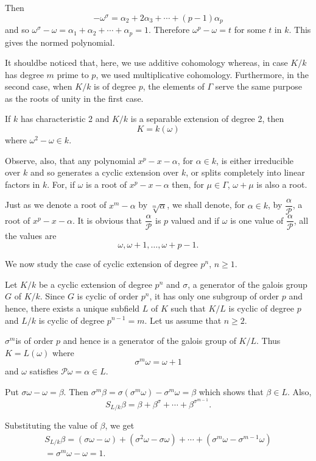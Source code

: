 Then
$$
- \omega^\sigma = \alpha_2 + 2 \alpha_3 + \cdots  + (p-1) \alpha_p 
$$
and so $\omega^\sigma - \omega = \alpha_1 + \alpha_2 + \cdots +
\alpha_p =1$. Therefore $\omega^p - \omega =t$ for some $t$ in
$k$. This gives the normed polynomial. 

It should\pageoriginale be noticed that, here, we use additive
cohomology whereas, in case $K/k$ has degree $m$ prime to $p$, we used
multiplicative cohomology. Furthermore, in the second case, when $K/k$
is of degree $p$, the elements of $\Gamma$ serve the same purpose as
the roots of unity in the first case.  

If $k$ has characteristic 2 and $K/k$ is a separable extension of
degree 2, then 
$$
K = k(\omega)
$$
where $\omega^2-\omega \in k$.

Observe, also, that any polynomial $x^p-x-\alpha$, for $\alpha \in k$,
is either irreducible over $k$ and so generates a cyclic extension
over $k$, or splits completely into linear factors in $k$. For, if
$\omega$ is a root of $x^p - x-\alpha$ then, for $\mu \in \Gamma$,
$\omega + \mu$ is also a root. 

Just as we denote a root of $x^m - \alpha$ by $\sqrt[m]{\alpha}$, we
shall denote, for $\alpha \in k$, by $\dfrac{\alpha}{\mathscr{P}}$, a
root of $x^p-x-\alpha$. It is obvious that
$\dfrac{\alpha}{\mathscr{P}}$ is $p$ valued and if $\omega$ is one
value of $\dfrac{\alpha}{\mathscr{P}}$, all the values are 
$$
\omega, \omega + 1, \ldots,\omega + p-1.
$$

We now study the case of cyclic extension of degree $p^n$, $n \geq 1$.

Let $K/k$ be a cyclic extension of degree $p^n$ and $\sigma$, a
generator of the galois group $G$ of $K/k$. Since $G$ is cyclic of
order $p^n$, it has only one subgroup of order $p$ and hence, there
exists a unique subfield $L$ of $K$ such that $K/L$ is cyclic of
degree $p$ and $L/k$ is cyclic of degree $p^{n-1}=m$. Let us assume
that $n \geq 2$. 

$\sigma^m$\pageoriginale is of order $p$ and hence is a generator of
the galois group of $K/L$. Thus $K=L(\omega)$ where  
$$
\sigma^m \omega = \omega +1
$$
and $\omega$ satisfies $\mathscr{P} \omega = \alpha \in L$.

Put $\sigma \omega -\omega=\beta$. Then $\sigma^m \beta = \sigma
(\sigma^m \omega)- \sigma^m \omega = \beta$ which shows that $\beta
\in L$. Also, 
$$
S_{L/k} \beta = \beta + \beta^\sigma + \cdots + \beta^{\sigma^{m-1}}.
$$

Substituting the value of $\beta$, we get
\begin{gather*}
S_{L/k} \beta = (\sigma \omega - \omega) + (\sigma^2 \omega - \sigma
\omega)+ \cdots + (\sigma^m \omega - \sigma^{m-1} \omega) \\ 
= \sigma^m \omega - \omega = 1.
\end{gather*}

